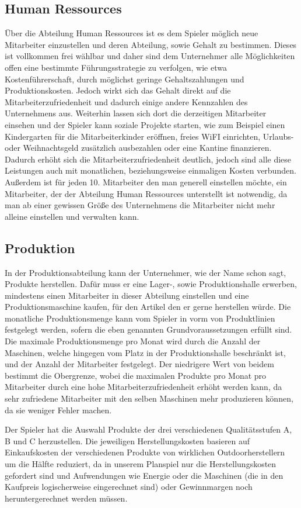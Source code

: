 \subsection{Human Ressources}
Über die Abteilung Human Ressources ist es dem Spieler möglich neue Mitarbeiter einzustellen und deren Abteilung, sowie Gehalt zu bestimmen. Dieses ist vollkommen frei wählbar und daher sind dem Unternehmer alle Möglichkeiten offen eine bestimmte Führungsstrategie zu verfolgen, wie etwa Kostenführerschaft, durch möglichst geringe Gehaltszahlungen und Produktionskosten. Jedoch wirkt sich das Gehalt direkt auf die Mitarbeiterzufriedenheit und dadurch einige andere Kennzahlen des Unternehmens aus. Weiterhin lassen sich dort die derzeitigen Mitarbeiter einsehen und der Spieler kann soziale Projekte starten, wie zum Beispiel einen Kindergarten für die Mitarbeiterkinder eröffnen, freies WiFI einrichten, Urlaubs- oder Weihnachtsgeld zusätzlich ausbezahlen oder eine Kantine finanzieren. Dadurch erhöht sich die Mitarbeiterzufriedenheit deutlich, jedoch sind alle diese Leistungen auch mit monatlichen, beziehungsweise einmaligen Kosten verbunden. Außerdem ist für jeden 10. Mitarbeiter den man generell einstellen möchte, ein Mitarbeiter, der der Abteilung Human Ressources unterstellt ist notwendig, da man ab einer gewissen Größe des Unternehmens die Mitarbeiter nicht mehr alleine einstellen und verwalten kann. 

\subsection{Produktion}
In der Produktionsabteilung kann der Unternehmer, wie der Name schon sagt, Produkte herstellen. Dafür muss er eine Lager-, sowie Produktionshalle erwerben, mindestens einen Mitarbeiter in dieser Abteilung einstellen und eine Produktionsmaschine kaufen, für den Artikel den er gerne herstellen würde. Die monatliche Produktionsmenge kann vom Spieler in vorm von Produktlinien festgelegt werden, sofern die eben genannten Grundvoraussetzungen erfüllt sind. Die maximale Produktionsmenge pro Monat wird durch die Anzahl der Maschinen, welche hingegen vom Platz in der Produktionshalle beschränkt ist, und der Anzahl der Mitarbeiter festgelegt. Der niedrigere Wert von beidem bestimmt die Obergrenze, wobei die maximalen Produkte pro Monat pro Mitarbeiter durch eine hohe Mitarbeiterzufriedenheit erhöht werden kann, da sehr zufriedene Mitarbeiter mit den selben Maschinen mehr produzieren können, da sie weniger Fehler machen.

Der Spieler hat die Auswahl Produkte der drei verschiedenen Qualitätsstufen A, B und C herzustellen. Die jeweiligen Herstellungskosten basieren auf Einkaufskosten der verschiedenen Produkte von wirklichen Outdoorherstellern um die Hälfte reduziert, da in unserem Planspiel nur die Herstellungskosten gefordert sind und Aufwendungen wie Energie oder die Maschinen (die in den Kaufpreis logischerweise eingerechnet sind) oder Gewinnmargen noch heruntergerechnet werden müssen. 

